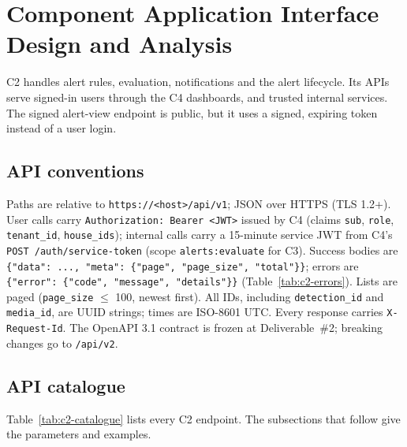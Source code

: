 \section{Component Application Interface Design and Analysis}\label{sec:c2-api}

C2 handles alert rules, evaluation, notifications and the alert lifecycle. Its APIs serve signed-in
users through the C4 dashboards, and trusted internal services. The signed alert-view endpoint is
public, but it uses a signed, expiring token instead of a user login.

\subsection{API conventions}
Paths are relative to \texttt{https://<host>/api/v1}; JSON over HTTPS (TLS 1.2+). User calls carry
\texttt{Authorization: Bearer <JWT>} issued by C4 (claims \texttt{sub}, \texttt{role}, \texttt{tenant\_id}, \texttt{house\_ids});
internal calls carry a 15-minute service JWT from C4's \texttt{POST /auth/service-token} (scope \texttt{alerts:evaluate} for C3).
Success bodies are \texttt{\{"data": ..., "meta": \{"page", "page\_size", "total"\}\}}; errors are
\texttt{\{"error": \{"code", "message", "details"\}\}} (Table~\ref{tab:c2-errors}). Lists are paged (\texttt{page\_size} $\le$ 100,
newest first). All IDs, including \texttt{detection\_id} and \texttt{media\_id}, are UUID strings; times are ISO-8601 UTC.
Every response carries \texttt{X-Request-Id}. The OpenAPI 3.1 contract is frozen at Deliverable~\#2; breaking changes go to \texttt{/api/v2}.

\subsection{API catalogue}
Table~\ref{tab:c2-catalogue} lists every C2 endpoint. The subsections that follow give the
parameters and examples.

